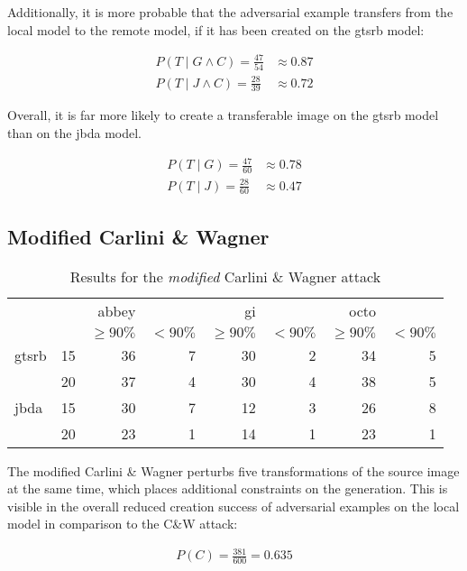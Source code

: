 Additionally, it is more probable that the adversarial example transfers from the local model to the remote model, if it has been created on the gtsrb model:

\begin{align*}
P(T \mid G \wedge C) = \frac{47}{54} &\approx 0.87\\[1ex]
P(T \mid J \wedge C) = \frac{28}{39} &\approx 0.72
\end{align*}

Overall, it is far more likely to create a transferable image on the gtsrb model than on the jbda model. 

\begin{align*}
P(T \mid G) = \frac{47}{60} &\approx 0.78 \\[1ex]
P(T \mid J) = \frac{28}{60} &\approx 0.47
\end{align*}

\subsection{Modified Carlini \& Wagner}

\begin{table}
\begin{tabular}{l l | r r | r r | r r}
& & abbey & & gi & & octo & \\[1ex]
& & \footnotesize$\geq90\%$ & \footnotesize$<90\%$ & \footnotesize$\geq90\%$ & \footnotesize$<90\%$ & \footnotesize$\geq90\%$ & \footnotesize$<90\%$ \\[1ex]
\hline
gtsrb & 15 & 36 & 7 & 30 & 2 & 34 & 5
\\[1ex]
 & 20 & 37 & 4 & 30 & 4 & 38 & 5\\[1ex]
\hline
jbda & 15 & 30 & 7 & 12 & 3 & 26 & 8
\\[1ex]
  & 20 & 23 & 1 & 14 & 1 & 23 & 1
\end{tabular}
\caption{Results for the \textit{modified} Carlini \& Wagner attack}
\label{tab:robust_result}
\end{table}

The modified Carlini \& Wagner perturbs five transformations of the source image at the same time, which places additional constraints on the generation. This is visible in the overall reduced creation success of adversarial examples on the local model in comparison to the C\&W attack:

\begin{align*}
P(C) = \frac{381}{600} = 0.635
\end{align*}

